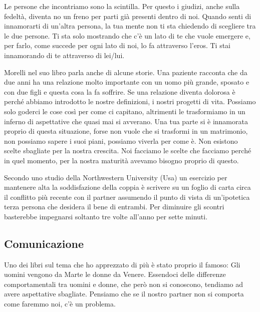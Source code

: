 \documentclass[12pt]{book} %
\begin{document}
Le persone che incontriamo sono la scintilla. Per questo i giudizi, anche sulla fedeltà, diventa no un freno per parti
già presenti dentro di noi. Quando senti di innamorarti di un'altra persona, la tua mente non ti sta chiedendo di
scegliere tra le due persone. Ti sta solo mostrando che c'è un lato di te che vuole emergere e, per farlo, come succede
per ogni lato di noi, lo fa attraverso l'eros. Ti stai innamorando di te attraverso di
lei/lui. 

Morelli nel suo libro parla anche di alcune storie. Una paziente racconta che da due anni ha una relazione molto
importante con un uomo più grande, sposato e con due figli e questa cosa la fa soffrire. Se una relazione diventa
dolorosa è perché abbiamo introdotto le nostre definizioni, i nostri progetti di vita. Possiamo solo goderci le cose
così per come ci capitano, altrimenti le trasformiamo in un inferno di aspettative che quasi mai si avverano. Una tua
parte si è innamorata proprio di questa situazione, forse non vuole che si trasformi in un matrimonio, non possiamo
sapere i suoi piani, possiamo viverla per come è. Non esistono scelte sbagliate per la nostra crescita. Noi facciamo le
scelte che facciamo perché in quel momento, per la nostra maturità avevamo bisogno proprio di questo. 

\begin{mdframed}[linewidth=1pt]
Secondo uno studio della Northwestern University (Usa) un esercizio per mantenere alta la soddisfazione della coppia è
scrivere su un foglio di carta circa il conflitto più recente con il partner assumendo il punto di vista di
un'ipotetica terza persona che desidera il bene di entrambi. Per diminuire gli scontri basterebbe impegnarsi soltanto
tre volte all'anno per sette
minuti.
\end{mdframed}

\subsection{Comunicazione}
Uno dei libri sul tema che ho apprezzato di più è stato proprio il famoso: Gli uomini vengono da Marte le donne da
Venere. Essendoci delle
differenze comportamentali tra uomini e donne, che però non si conoscono, tendiamo ad avere aspettative sbagliate.
Pensiamo che se il nostro partner non si comporta come faremmo noi, c'è un problema. 
\end{document}
